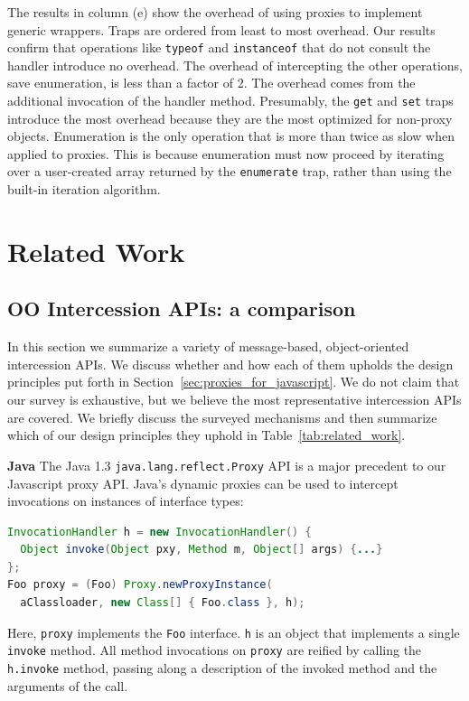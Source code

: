 \documentclass{sig-alternate}
\begin{document}
The results in column (e) show the overhead of using proxies to implement generic wrappers. Traps are ordered from least to most overhead. Our results confirm that operations like \texttt{typeof} and \texttt{instanceof} that do not consult the handler introduce no overhead. The overhead of intercepting the other operations, save enumeration, is less than a factor of 2. The overhead comes from the additional invocation of the handler method. Presumably, the \texttt{get} and \texttt{set} traps introduce the most overhead because they are the most optimized for non-proxy objects. Enumeration is the only operation that is more than twice as slow when applied to proxies. This is because enumeration must now proceed by iterating over a user-created array returned by the \texttt{enumerate} trap, rather than using the built-in iteration algorithm.

\section{Related Work}

\subsection{OO Intercession APIs: a comparison}
\label{sub:survey}

In this section we summarize a variety of message-based, object-oriented intercession APIs. We discuss whether and how each of them upholds the design principles put forth in Section~\ref{sec:proxies_for_javascript}. We do not claim that our survey is exhaustive, but we believe the most representative intercession APIs are covered. We briefly discuss the surveyed mechanisms and then summarize which of our design principles they uphold in Table~\ref{tab:related_work}.

\textbf{Java} The Java 1.3 \texttt{java.lang.reflect.Proxy} API is a major precedent to our Javascript proxy API. Java's dynamic proxies can be used to intercept invocations on instances of interface types:

\begin{lstlisting}[language=java]
InvocationHandler h = new InvocationHandler() {
  Object invoke(Object pxy, Method m, Object[] args) {...}
};
Foo proxy = (Foo) Proxy.newProxyInstance(
  aClassloader, new Class[] { Foo.class }, h);
\end{lstlisting}

Here, \texttt{proxy} implements the \texttt{Foo} interface. \texttt{h} is an object that implements a single \texttt{invoke} method. All method invocations on \texttt{proxy} are reified by calling the \texttt{h.invoke} method, passing along a description of the invoked method and the arguments of the call.
\end{document}
